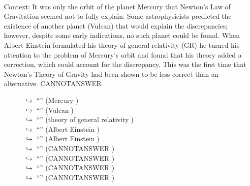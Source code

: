\documentclass[11pt,a4paper, onecolumn]{article}
\begin{document}
\\ Context: It was only the orbit of the planet Mercury that Newton's Law of Gravitation seemed not to fully explain. Some astrophysicists predicted the existence of another planet (Vulcan) that would explain the discrepancies; however, despite some early indications, no such planet could be found. When Albert Einstein formulated his theory of general relativity (GR) he turned his attention to the problem of Mercury's orbit and found that his theory added a correction, which could account for the discrepancy. This was the first time that Newton's Theory of Gravity had been shown to be less correct than an alternative. CANNOTANSWER

\begin{figure}[t] \small \begin{tcolorbox}[boxsep=0pt,left=5pt,right=0pt,top=2pt,colback = yellow!5] \begin{dialogue}
 \small 
\colorbox{pink!25}{$\hookrightarrow$}
{ ``'' (Mercury ) }
\\
\colorbox{pink!25}{$\hookrightarrow$}
{ ``'' (Vulcan ) }
\\
\colorbox{pink!25}{$\hookrightarrow$}
{ ``'' (theory of general relativity ) }
\\
\colorbox{pink!25}{$\hookrightarrow$}
{ ``'' (Albert Einstein ) }
\\
\colorbox{pink!25}{$\hookrightarrow$}
{ ``'' (Albert Einstein ) }
\\
\colorbox{pink!25}{$\hookrightarrow$}
{ ``'' (CANNOTANSWER ) }
\\
\colorbox{pink!25}{$\hookrightarrow$}
{ ``'' (CANNOTANSWER ) }
\\
\colorbox{pink!25}{$\hookrightarrow$}
{ ``'' (CANNOTANSWER ) }
\\
\colorbox{pink!25}{$\hookrightarrow$}
{ ``'' (CANNOTANSWER ) }
\\
 \end{dialogue}\end{tcolorbox}\end{figure}
\end{document}
